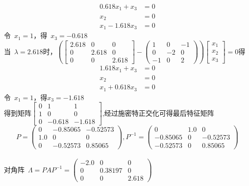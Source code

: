 \documentclass{article}
\begin{document}
\begin{align*}
0.618x_1+x_3 &= 0 \\
x_2 &= 0 \\
x_1-1.618x_3 &=0
\end{align*}
\mbox{令 }$x_1=1$，\mbox{得 }$x_3=-0.618$ \\
\mbox{当 }$ \lambda=2.618$\mbox{时}，$ \left(\left[\begin{array}{ccc} 2.618 & 0 & 0\\ 0 & 2.618 & 0\\ 0 & 0 & 2.618 \end{array}\right]-\left(\begin{array}{ccc} 1 & 0 & -1\\ 0 & -2 & 0\\ -1 & 0 & 2 \end{array}\right)\right)\left[\begin{array}{ccc} x_{1} \\ x_{2}  \\ x_{3} \end{array}\right]=0 $得\\
\begin{align*}
1.618x_1+x_3 &= 0 \\
x_2 &= 0 \\
x_1+0.618x_3 &= 0
\end{align*}
\mbox{令 }$x_1=1$，得$x_3=-1.618$ \\
\mbox{得到矩阵}$ \left[\begin{array}{ccc} 0 & 1 & 1 \\ 1 & 0 & 0 \\ 0 & -0.618 & -1.618\end{array}\right] $,经过施密特正交化可得最后特征矩阵 \\
$$ P=\left(\begin{array}{ccc} 0 & -0.85065 & -0.52573\\ 1.0 & 0 & 0\\ 0 & -0.52573 & 0.85065 \end{array}\right),
P^{-1}=\left(\begin{array}{ccc} 0 & 1.0 & 0\\ -0.85065 & 0 & -0.52573\\ -0.52573 & 0 & 0.85065 \end{array}\right) $$ \\
\mbox{对角阵 }$ \Lambda=PAP^{-1}= \left(\begin{array}{ccc} -2.0 & 0 & 0\\ 0 & 0.38197 & 0\\ 0 & 0 & 2.618 \end{array}\right) $ \\
\end{document}
